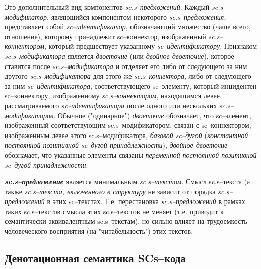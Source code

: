 \begin{SCn}
Это дополнительный вид компонентов \textit{sc.s--предложений}. Каждый \textit{sc.s--модификатор}, являющийся компонентом некоторого \textit{sc.s--предложения}, представляет собой \textit{sc--идентификатор}, обозначающий множество (чаще всего, отношение), которому принадлежит sc--коннектор, изображенный \textit{sc.s--коннектором}, который предшествует указанному \textit{sc--идентификатору}. Признаком \textit{sc.s--модификатора} является \textit{двоеточие} (или \textit{двойное двоеточие}), которое ставится после \textit{sc.s--модификатора} и отделяет его либо от следующего за ним другого \textit{sc.s--модификатора} для этого же \textit{sc.s--коннектора}, либо от следующего за ним \textit{sc--идентификатора}, соответствующего sc--элементу, который инцидентен sc--коннектору, изображенному \textit{sc.s--коннектором}, находящимся левее рассматриваемого \textit{sc--идентификатора} после одного или нескольких \textit{sc.s--модификаторов}. Обычное ("одинарное"{}) \textit{двоеточие} обозначает, что sc--элемент, изображенный соответствующим \mbox{sc.s--модификатором}, связан с sc--коннектором, изображенным левее этого \mbox{sc.s--модификатора}, \textit{базовой \mbox{sc--дугой}} (\textit{константной постоянной позитивной \mbox{sc--дугой} принадлежности}), \textit{двойное двоеточие} обозначает, что указанные элементы связаны \textit{переменной постоянной позитивной \mbox{sc--дугой} принадлежности}.

\end{SCn}

\textbf{\textit{sc.s--предложение}} является минимальным \textit{sc.s--текстом}. Смысл sc.s--текста (а также \textit{sc.s--текста, включенного в структуру} не зависит от порядка \textit{\mbox{sc.s--предложений}} в этих sc--текстах. Т.е. перестановка \textit{\mbox{sc.s--предложений}} в рамках таких \mbox{sc.s--текстов} смысла этих \mbox{sc.s--текстов} не меняет (т.е. приводит к семантически эквивалентным \mbox{sc.s--текстам}), но сильно влияет на трудоемкость человеческого восприятия (на "читабельность"{}) этих текстов.


\newpage
\subsection{Денотационная семантика SCs--кода}

